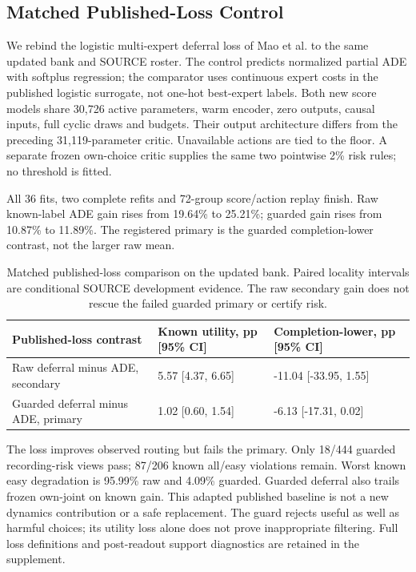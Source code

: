 \documentclass[10pt,twocolumn,letterpaper]{article}
\begin{document}
\subsection{Matched Published-Loss Control}
We rebind the logistic multi-expert deferral loss of Mao et al. \cite{ref3} to the same updated bank and SOURCE roster. The control predicts normalized partial ADE with softplus regression; the comparator uses continuous expert costs in the published logistic surrogate, not one-hot best-expert labels. Both new score models share 30,726 active parameters, warm encoder, zero outputs, causal inputs, full cyclic draws and budgets. Their output architecture differs from the preceding 31,119-parameter critic. Unavailable actions are tied to the floor. A separate frozen own-choice critic supplies the same two pointwise 2\% risk rules; no threshold is fitted.

All 36 fits, two complete refits and 72-group score/action replay finish. Raw known-label ADE gain rises from 19.64\% to 25.21\%; guarded gain rises from 10.87\% to 11.89\%. The registered primary is the guarded completion-lower contrast, not the larger raw mean.

\begin{table}[!t]
\centering\small
\begin{tabularx}{\textwidth}{@{}XXX@{}}\toprule
Published-loss contrast & Known utility, pp [95\% CI] & Completion-lower, pp [95\% CI] \\
\midrule
Raw deferral minus ADE, secondary & 5.57 [4.37, 6.65] & -11.04 [-33.95, 1.55] \\
Guarded deferral minus ADE, primary & 1.02 [0.60, 1.54] & -6.13 [-17.31, 0.02] \\
\bottomrule
\end{tabularx}
\caption{Matched published-loss comparison on the updated bank. Paired locality intervals are conditional SOURCE development evidence. The raw secondary gain does not rescue the failed guarded primary or certify risk.}
\end{table}
The loss improves observed routing but fails the primary. Only 18/444 guarded recording-risk views pass; 87/206 known all/easy violations remain. Worst known easy degradation is 95.99\% raw and 4.09\% guarded. Guarded deferral also trails frozen own-joint on known gain. This adapted published baseline is not a new dynamics contribution or a safe replacement. The guard rejects useful as well as harmful choices; its utility loss alone does not prove inappropriate filtering. Full loss definitions and post-readout support diagnostics are retained in the supplement.
\end{document}
